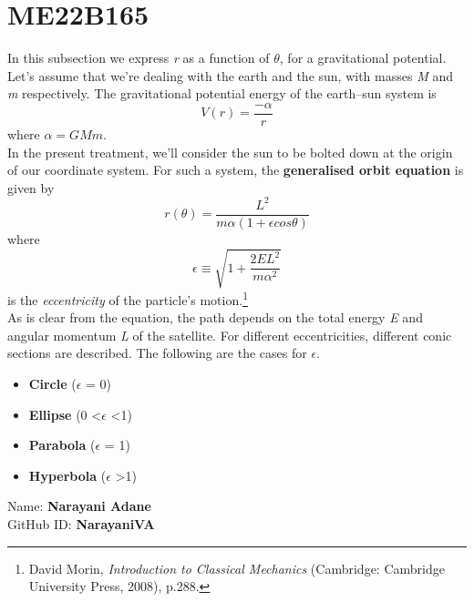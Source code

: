 \section*{ME22B165}
 In this subsection we express \textit{r} as a function of $\theta$, for a gravitational potential. Let’s assume that we’re dealing with the earth and the sun, with masses \textit{M} and \textit{m} respectively. The gravitational potential energy of the earth–sun
system is
\[V(r)=\frac{-\alpha}{r}\] where $\alpha=GMm$.
\\In the present treatment, we’ll consider the sun to be bolted down at the origin of our coordinate system. For such a system, the \textbf{generalised orbit equation} is given by
\[r(\theta)=\frac{L^2}{m\alpha(1+\epsilon cos\theta)}\]
where  \[\epsilon \equiv \sqrt{{1+\frac{2EL^2}{m\alpha^2}}}\] is the \textit{eccentricity} of the particle’s motion.\footnote{David Morin, \textit{Introduction to Classical Mechanics} (Cambridge: Cambridge University Press, 2008), p.288.}
\\As is clear from the equation, the path depends on the total energy \textit{E} and angular momentum \textit{L} of the satellite. For different eccentricities, different conic sections are described. The following are the cases for $\epsilon$.
\begin{itemize}
\item \textbf{Circle} ($\epsilon$ = 0)
\item \textbf{Ellipse} (0 \textless $\epsilon$ \textless 1)
\item \textbf{Parabola} ($\epsilon$ = 1)
\item \textbf{Hyperbola} ($\epsilon$ \textgreater 1)
\end{itemize}
Name: \textbf{Narayani Adane}
\\GitHub ID: \textbf{NarayaniVA}
